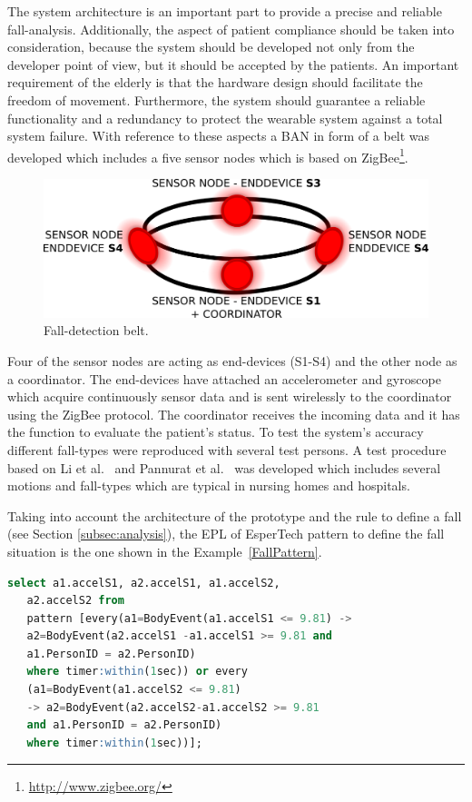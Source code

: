 \documentclass[conference]{IEEEtran}
\theoremstyle{definition}
\begin{document}
The system architecture is an important part to provide a precise and reliable fall-analysis. 
Additionally, the aspect of patient compliance should be taken into consideration, because the 
system should be developed not only from the developer point of view, but it should be accepted 
by the patients. An important requirement of the elderly is that the hardware design should 
facilitate the freedom of movement. Furthermore, the system should guarantee a reliable 
functionality and a redundancy to protect the wearable system against a total system failure. 
With reference to these aspects a BAN in form of a belt was developed which 
includes a five sensor nodes which is based on ZigBee\footnote{\url{http://www.zigbee.org/}}.

\begin{figure}[!h]
  \centering
  \includegraphics[scale=0.25]{./img/belt}
  \caption[Fall-detection belt]{Fall-detection belt.}
  \label{fig:belt}
\end{figure}

Four of the sensor nodes are acting as end-devices (S1-S4) and the other node as a coordinator. 
The end-devices have attached an accelerometer and gyroscope which acquire continuously sensor 
data and is sent wirelessly to the coordinator using the ZigBee protocol. The coordinator receives 
the incoming data and it has the function to evaluate the patient's status. 
To test the system's accuracy different fall-types were reproduced with several test persons. A 
test procedure based on Li et al.~\cite{Li2009} and Pannurat et al.~\cite{Pannurat2014} was developed which includes 
several motions and fall-types which are typical in nursing homes and hospitals.

Taking into account the architecture of the prototype and the rule to define a fall (see Section \ref{subsec:analysis}), 
the EPL of EsperTech pattern to define the fall situation is the one shown in the Example~\ref{FallPattern}.

\begin{lstlisting}[basicstyle=\ttfamily\footnotesize,language=SQL,caption=Fall pattern,label=FallPattern]
  select a1.accelS1, a2.accelS1, a1.accelS2, 
   a2.accelS2 from 
   pattern [every(a1=BodyEvent(a1.accelS1 <= 9.81) -> 
   a2=BodyEvent(a2.accelS1 -a1.accelS1 >= 9.81 and 
   a1.PersonID = a2.PersonID) 
   where timer:within(1sec)) or every 
   (a1=BodyEvent(a1.accelS2 <= 9.81)
   -> a2=BodyEvent(a2.accelS2-a1.accelS2 >= 9.81
   and a1.PersonID = a2.PersonID) 
   where timer:within(1sec))];
 \end{lstlisting}
\end{document}
